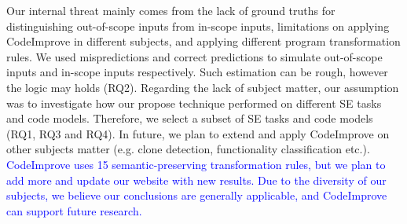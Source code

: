 


Our internal threat mainly comes from the lack of ground truths for distinguishing out-of-scope inputs from in-scope inputs, limitations on applying CodeImprove in different subjects, and applying different program transformation rules. We used mispredictions and correct predictions to simulate out-of-scope inputs and in-scope inputs respectively. Such estimation can be rough, however the logic may holds (RQ2). Regarding the lack of subject matter, our assumption was to investigate how our propose technique performed on different SE tasks and code models. Therefore, we select a subset of SE tasks and code models (RQ1, RQ3 and RQ4). In future, we plan to extend and apply CodeImprove on other subjects matter (e.g. clone detection, functionality classification etc.). \textcolor{blue}{CodeImprove uses 15 semantic-preserving transformation rules, but we plan to add more and update our website with new results. Due to the diversity of our subjects, we believe our conclusions are generally applicable, and CodeImprove can support future research.}

